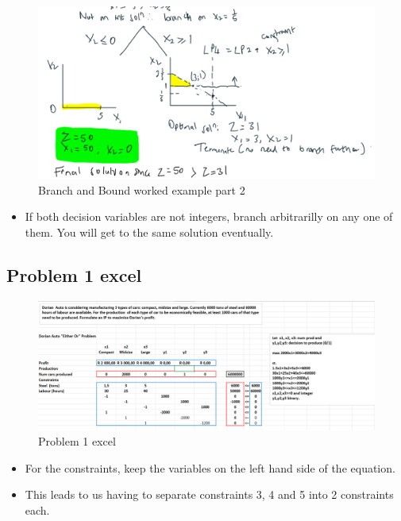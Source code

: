 \documentclass[12pt, a4paper]{article}
\begin{document}
\begin{figure}[ht]
    \centering
    \includegraphics*[width=1.2\textwidth]{Branch_and_Bound_workedexample_part2}
    \caption{Branch and Bound worked example part 2}
    \label{fig: Branch and Bound worked example part 2}
\end{figure}
\begin{itemize}
    \item If both decision variables are not integers, branch arbitrarilly on any one of them. You will get to the same solution eventually.
\end{itemize}
\pagebreak

\subsection*{Problem 1 excel}
\begin{figure}[ht]
    \centering
    \includegraphics*[width=1.2\textwidth]{Problem_1_excel.png}
    \caption{Problem 1 excel}
    \label{fig: Problem 1 excel}
\end{figure}
\begin{itemize}
    \item For the constraints, keep the variables on the left hand side of the equation.
    \item This leads to us having to separate constraints 3, 4 and 5 into 2 constraints each.
\end{itemize}
\end{document}
